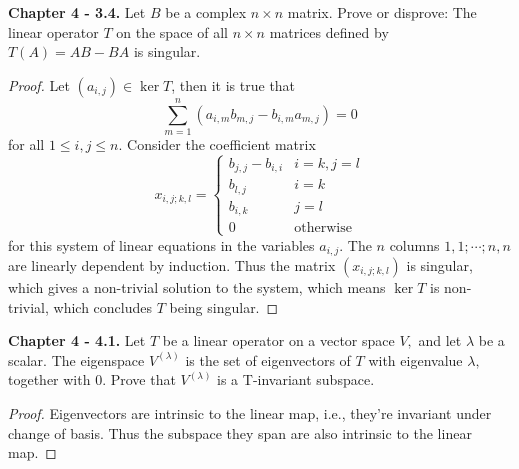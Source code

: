 \documentclass[10pt]{report}
\theoremstyle{definition}
\begin{document}
\newpage
\textbf{Chapter 4 - 3.4.} Let $B$ be a complex $n \times n$ matrix. Prove or disprove: The linear operator $T$ on the space of all $n \times n$ matrices defined by $T(A)=A B-B A$ is singular.
\begin{proof}
Let $(a_{i,j})\in\ker T$, then it is true that $$\sum_{m=1}^n(a_{i,m}b_{m,j}-b_{i,m}a_{m,j})=0$$ for all $1\leq i,j\leq n$.
Consider the coefficient matrix
$$x_{i,j;k,l}=\begin{cases}
b_{j,j}-b_{i,i}&i=k,j=l\\
b_{l,j}&i=k\\
b_{i,k}&j=l\\
0&\mbox{otherwise}
\end{cases}$$
for this system of linear equations in the variables $a_{i,j}$.
The $n$ columns $1,1;\cdots;n,n$ are linearly dependent by induction.
Thus the matrix $(x_{i,j;k,l})$ is singular, which gives a non-trivial solution to the system, which means $\ker T$ is non-trivial, which concludes $T$ being singular.
\end{proof}

\textbf{Chapter 4 - 4.1.} Let $T$ be a linear operator on a vector space $V,$ and let $\lambda$ be a scalar. The eigenspace $V^{(\lambda)}$ is the set of eigenvectors of $T$ with eigenvalue $\lambda,$ together with $0 .$ Prove that $V^{(\lambda)}$ is a T-invariant subspace.
\begin{proof}
Eigenvectors are intrinsic to the linear map, i.e., they're invariant under change of basis. Thus the subspace they span are also intrinsic to the linear map.
\end{proof}
\end{document}

